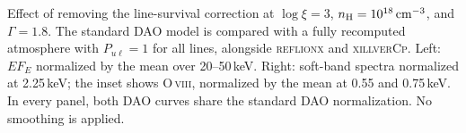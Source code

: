 \caption{Effect of removing the line-survival correction at
$\log\xi=3$, $n_{\rm H}=10^{18}\,\mathrm{cm}^{-3}$, and $\Gamma=1.8$.
The standard \textsc{DAO} model is compared with a fully recomputed atmosphere
with $P_{u\ell}=1$ for all lines, alongside \textsc{reflionx} and \textsc{xillverCp}.
Left: $E F_E$ normalized by the mean over 20--50\,keV.
Right: soft-band spectra normalized at 2.25\,keV; the inset shows
O\,\textsc{viii}, normalized by the mean at 0.55 and 0.75\,keV.
In every panel, both \textsc{DAO} curves share the standard \textsc{DAO}
normalization. No smoothing is applied.}
\label{fig:all_survival_off_comparison}
